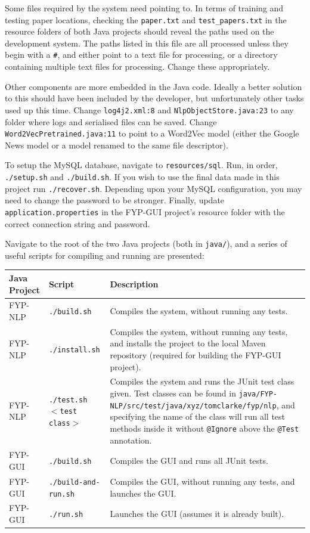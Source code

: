 \begin{appendices}
\noindent Some files required by the system need pointing to. 
In terms of training and testing paper locations, checking the \texttt{paper.txt} and \texttt{test\_papers.txt} in the resource folders of both Java projects should reveal the paths used on the development system. The paths listed in this file are all processed unless they begin with a \texttt{\#}, and either point to a text file for processing, or a directory containing multiple text files for processing. Change these appropriately. 

Other components are more embedded in the Java code. Ideally a better solution to this should have been included by the developer, but unfortunately other tasks used up this time. Change \texttt{log4j2.xml:8} and \texttt{NlpObjectStore.java:23} to any folder where logs and serialised files can be saved. Change \texttt{Word2VecPretrained.java:11} to point to a Word2Vec model (either the Google News model or a model renamed to the same file descriptor).

To setup the MySQL database, navigate to \texttt{resources/sql}. Run, in order, \texttt{./setup.sh} and \texttt{./build.sh}. If you wish to use the final data made in this project run \texttt{./recover.sh}. Depending upon your MySQL configuration, you may need to change the password to be stronger. Finally, update \texttt{application.properties} in the FYP-GUI project's resource folder with the correct connection string and password.

Navigate to the root of the two Java projects (both in \texttt{java/}), and a series of useful scripts for compiling and running are presented: \\

\noindent \begin{tabular}{ l | p{3.5cm} | p{9cm} }
	\textbf{Java Project} & \textbf{Script} & \textbf{Description} \\
	\hline
	FYP-NLP & \texttt{./build.sh} & Compiles the system, without running any tests. \\
	\hline
	FYP-NLP & \texttt{./install.sh} & Compiles the system, without running any tests, and installs the project to the local Maven repository (required for building the FYP-GUI project). \\
	\hline
	FYP-NLP & \texttt{./test.sh $<$test class$>$} & Compiles the system and runs the JUnit test class given. Test classes can be found in \texttt{java/FYP-NLP/src/test/java/xyz/tomclarke/fyp/nlp}, and specifying the name of the class will run all test methods inside it without \texttt{@Ignore} above the \texttt{@Test} annotation.  \\
	\hline
	FYP-GUI & \texttt{./build.sh} & Compiles the GUI and runs all JUnit tests. \\
	\hline
	FYP-GUI & \texttt{./build-and-run.sh} & Compiles the GUI, without running any tests, and launches the GUI. \\
	\hline
	FYP-GUI & \texttt{./run.sh} & Launches the GUI (assumes it is already built). \\
\end{tabular}

\end{appendices}

